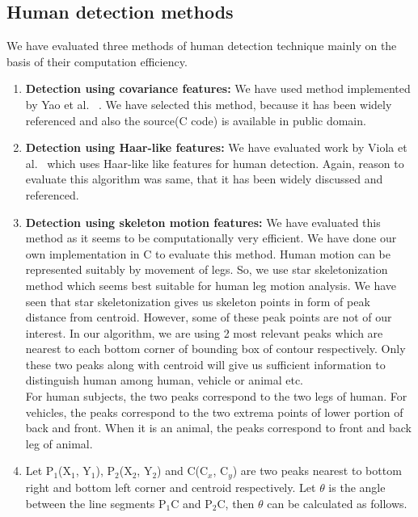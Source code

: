 \subsection{Human detection methods}
\indent We have evaluated three methods of human detection technique mainly on the
basis of their computation efficiency.
\begin{enumerate}
\item \textbf{Detection using covariance features:} We have used method
	implemented by Yao et al. ~\cite{19}. We have selected this
	method, because it has been widely referenced and also the
	source(C code) is available in public domain.\\
\item \textbf{Detection using Haar-like features:} We have evaluated
	work by Viola et al.~\cite{16, 17} which uses Haar-like like
	features for human detection. Again, reason to evaluate this
	algorithm was same, that it has been widely discussed and
	referenced.
\item \textbf{Detection using skeleton motion features:} We have
	evaluated this method as it seems to be computationally very
	efficient.  We have done our own implementation in C to evaluate
	this method.  Human motion can be represented suitably by
	movement of legs. So, we use star skeletonization method which
	seems best suitable for human leg motion analysis. We have seen
	that star skeletonization gives us skeleton points in form of peak
	distance from centroid. However, some of these peak points are
	not of our interest. In our algorithm, we are using 2 most relevant
	peaks which are nearest to each bottom corner of bounding box of
	contour respectively. Only these two peaks along with centroid
	will give us sufficient information to distinguish human among
	human, vehicle or animal etc.\\
\indent For human subjects, the two peaks correspond to the two legs of
human. For vehicles, the peaks correspond to the two extrema points of
lower portion of back and front.  When it is an animal, the peaks
correspond to front and back leg of animal.\\
\item Let P$_1$(X$_1$, Y$_1$), P$_2$(X$_2$, Y$_2$) and C(C$_x$, C$_y$)
are two peaks nearest to bottom right and bottom left corner and
centroid respectively. Let $\theta$ is the angle between the line
segments P$_1$C and P$_2$C, then $\theta$ can be calculated as
follows.\\
%
	\begin{equation}

\end{equation}
\end{enumerate}
